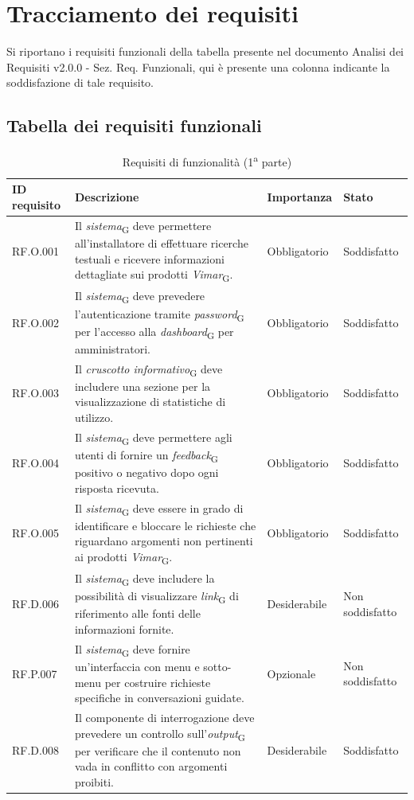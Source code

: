 \section{Tracciamento dei requisiti}
 Si riportano i requisiti funzionali della tabella
presente nel documento Analisi dei Requisiti v2.0.0 - Sez. Req. Funzionali, qui è presente una
colonna indicante la soddisfazione di tale requisito.

\subsection{Tabella dei requisiti funzionali}
\begin{table}[H]
\centering
    \begin{tabular}{|C{2.7cm}|L{6.5cm}|C{2.7cm}|C{2.7cm}|}
        \hline
        \textbf{ID requisito} & \textbf{Descrizione} & \textbf{Importanza} & \textbf{Stato}  \\
        \hline
        RF.O.001 & Il \textit{sistema}\textsubscript{G} deve permettere all'installatore di effettuare ricerche testuali e ricevere informazioni dettagliate sui prodotti \textit{Vimar}\textsubscript{G}. & Obbligatorio & Soddisfatto \\
        \hline
        RF.O.002 & Il \textit{sistema}\textsubscript{G} deve prevedere l'autenticazione tramite \textit{password}\textsubscript{G} per l'accesso alla \textit{dashboard}\textsubscript{G} per amministratori. & Obbligatorio & Soddisfatto \\
        \hline
        RF.O.003 & Il \textit{cruscotto informativo}\textsubscript{G} deve includere una sezione per la visualizzazione di statistiche di utilizzo. & Obbligatorio & Soddisfatto \\
        \hline
        RF.O.004 & Il \textit{sistema}\textsubscript{G} deve permettere agli utenti di fornire un \textit{feedback}\textsubscript{G} positivo o negativo dopo ogni risposta ricevuta. & Obbligatorio & Soddisfatto \\
        \hline
        RF.O.005 & Il \textit{sistema}\textsubscript{G} deve essere in grado di identificare e bloccare le richieste che riguardano argomenti non pertinenti ai prodotti \textit{Vimar}\textsubscript{G}. & Obbligatorio & Soddisfatto \\
        \hline
        RF.D.006 & Il \textit{sistema}\textsubscript{G} deve includere la possibilità di visualizzare \textit{link}\textsubscript{G} di riferimento alle fonti delle informazioni fornite. & Desiderabile & Non soddisfatto \\
        \hline
        RF.P.007 & Il \textit{sistema}\textsubscript{G} deve fornire un'interfaccia con menu e sotto-menu per costruire richieste specifiche in conversazioni guidate. & Opzionale & Non soddisfatto\\
        \hline
        RF.D.008 & Il componente di interrogazione deve prevedere un controllo sull’\textit{output}\textsubscript{G}
        per verificare che il contenuto non vada in conflitto con argomenti proibiti. & Desiderabile &  Soddisfatto \\
        \hline
        \end{tabular}
    \caption{Requisiti di funzionalità (1\textsuperscript{a}  parte)}
\end{table}
